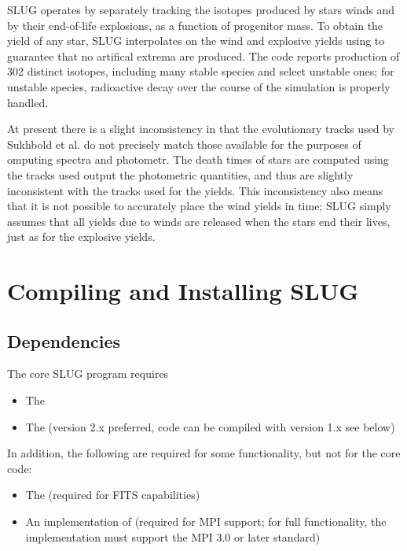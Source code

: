 \documentclass[letterpaper,10pt,english]{sphinxmanual}
\begin{document}
SLUG operates by separately tracking the isotopes produced by stars winds and by their end-of-life explosions, as a function of progenitor mass. To obtain the yield of any star, SLUG interpolates on the wind and explosive yields using  to guarantee that no artifical extrema are produced. The code reports production of 302 distinct isotopes, including many stable species and select unstable ones; for unstable species, radioactive decay over the course of the simulation is properly handled.

At present there is a slight inconsistency in that the evolutionary tracks used by Sukhbold et al. do not precisely match those available for the purposes of omputing spectra and photometr. The death times of stars are computed using the tracks used output the photometric quantities, and thus are slightly inconsistent with the tracks used for the yields. This inconsistency also means that it is not possible to accurately place the wind yields in time; SLUG simply assumes that all yields due to winds are released when the stars end their lives, just as for the explosive yields.


\chapter{Compiling and Installing SLUG}
\label{\detokenize{compiling::doc}}\label{\detokenize{compiling:compiling-and-installing-slug}}

\section{Dependencies}
\label{\detokenize{compiling:dependencies}}
The core SLUG program requires
\begin{itemize}
\item {} 
The 

\item {} 
The  (version 2.x preferred, code can be compiled with version 1.x \textendash{} see below)

\end{itemize}

In addition, the following are required for some functionality, but not for the core code:
\begin{itemize}
\item {} 
The  (required for FITS capabilities)

\item {} 
An implementation of  (required for MPI support; for full functionality, the implementation must support the MPI 3.0 or later standard)

\end{itemize}
\end{document}
